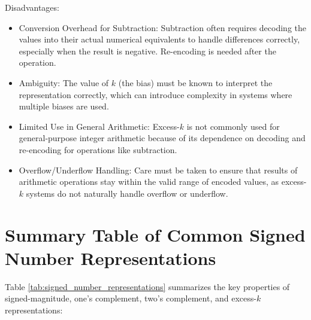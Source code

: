  \vspace{\baselineskip}\par
\noindent Disadvantages:
\begin{itemize}[topsep=0pt]
    \item Conversion Overhead for Subtraction: Subtraction often requires decoding the values into their actual numerical equivalents to handle differences correctly, especially when the result is negative. Re-encoding is needed after the operation.
    \item Ambiguity: The value of \( k \) (the bias) must be known to interpret the representation correctly, which can introduce complexity in systems where multiple biases are used.
    \item Limited Use in General Arithmetic: Excess-\( k \) is not commonly used for general-purpose integer arithmetic because of its dependence on decoding and re-encoding for operations like subtraction.
    \item Overflow/Underflow Handling: Care must be taken to ensure that results of arithmetic operations stay within the valid range of encoded values, as excess-\( k \) systems do not naturally handle overflow or underflow.
\end{itemize}


\section{Summary Table of Common Signed Number Representations}
Table \ref{tab:signed_number_representations} summarizes the key properties of signed-magnitude, one's complement, two's complement, and excess-\( k \) representations:

\renewcommand{\arraystretch}{1.3} %
\setlength{\tabcolsep}{5pt} %


